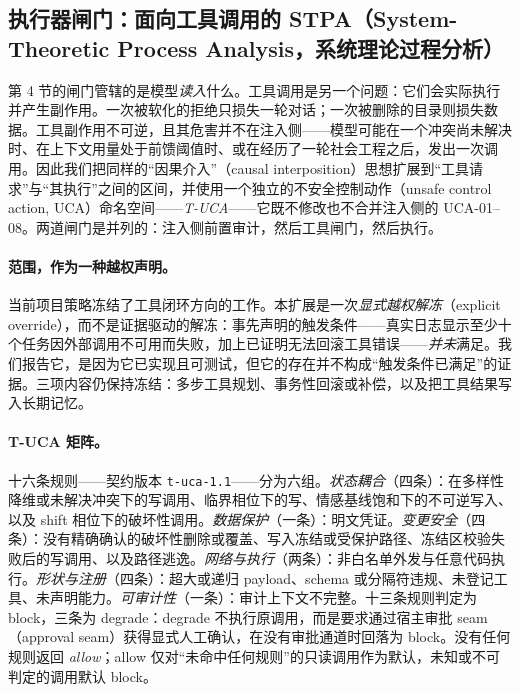 \subsection{执行器闸门：面向工具调用的 STPA（System-Theoretic Process Analysis，系统理论过程分析）}

第 4 节的闸门管辖的是模型\emph{读入}什么。工具调用是另一个问题：它们会实际执行并产生副作用。一次被软化的拒绝只损失一轮对话；一次被删除的目录则损失数据。工具副作用不可逆，且其危害并不在注入侧——模型可能在一个冲突尚未解决时、在上下文用量处于前馈阈值时、或在经历了一轮社会工程之后，发出一次调用。因此我们把同样的“因果介入”（causal interposition）思想扩展到“工具请求”与“其执行”之间的区间，并使用一个独立的不安全控制动作（unsafe control action, UCA）命名空间——\emph{T-UCA}——它既不修改也不合并注入侧的 UCA-01--08。两道闸门是并列的：注入侧前置审计，然后工具闸门，然后执行。

\paragraph{范围，作为一种越权声明。} 当前项目策略冻结了工具闭环方向的工作。本扩展是一次\emph{显式越权解冻}（explicit override），而不是证据驱动的解冻：事先声明的触发条件——真实日志显示至少十个任务因外部调用不可用而失败，加上已证明无法回滚工具错误——\emph{并未}满足。我们报告它，是因为它已实现且可测试，但它的存在并不构成“触发条件已满足”的证据。三项内容仍保持冻结：多步工具规划、事务性回滚或补偿，以及把工具结果写入长期记忆。

\paragraph{T-UCA 矩阵。} 十六条规则——契约版本 \texttt{t-uca-1.1}——分为六组。\emph{状态耦合}（四条）：在多样性降维或未解决冲突下的写调用、临界相位下的写、情感基线饱和下的不可逆写入、以及 shift 相位下的破坏性调用。\emph{数据保护}（一条）：明文凭证。\emph{变更安全}（四条）：没有精确确认的破坏性删除或覆盖、写入冻结或受保护路径、冻结区校验失败后的写调用、以及路径逃逸。\emph{网络与执行}（两条）：非白名单外发与任意代码执行。\emph{形状与注册}（四条）：超大或递归 payload、schema 或分隔符违规、未登记工具、未声明能力。\emph{可审计性}（一条）：审计上下文不完整。十三条规则判定为 block，三条为 degrade：degrade 不执行原调用，而是要求通过宿主审批 seam（approval seam）获得显式人工确认，在没有审批通道时回落为 block。没有任何规则返回 \emph{allow}；allow 仅对“未命中任何规则”的只读调用作为默认，未知或不可判定的调用默认 block。

